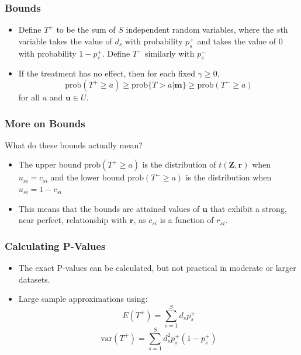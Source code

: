 \documentclass{beamer}
\begin{document}
  \begin{frame}
    \frametitle{Bounds}
    \begin{itemize}
    \item Define $T^+$ to be the sum of $S$ independent random
      variables, where the $s$th variable takes the value of $d_s$
      with probability $p^+_s$ and takes the value of 0 with
      probability $1-p^+_s$. Define $T^-$ similarly with $p^-_s$
   \item If the treatment has no effect, then for each fixed $\gamma \geq 0$,
$$\textrm{prob}(T^+\geq a) \geq \textrm{prob}\{T>a|\mathbf{m}\} \geq
\textrm{prob}(T^- \geq a)$$
for all $a$ and $\mathbf{u} \in U$.
  \end{itemize}
  \end{frame}
  \begin{frame}
    \frametitle{More on Bounds}
What do these bounds actually mean?

    \begin{itemize}
   \item<+-> The upper bound $\textrm{prob}(T^+\geq a) $ is the
      distribution of $t(\mathbf{Z},\mathbf{r})$ when $u_{si}=c_{si}$
      and the lower bound $\textrm{prob}(T^- \geq a)$ is the
      distribution when $u_{si}=1-c_{si}$
    \item<+-> This means that the bounds are attained values of
      $\mathbf{u}$ that exhibit a strong, near perfect, relationship
      with $\mathbf{r}$, as $c_{si}$ is a function of $r_{si}$. 
    \end{itemize}
  \end{frame}
  \begin{frame}
    \frametitle{Calculating P-Values}
    \begin{itemize}
    \item<+-> The \textrm{exact} P-values can be calculated, but not practical in
      moderate or larger datasets.
    \item<+-> Large sample approximations using: 
$$E(T^+)=\sum_{s=1}^Sd_sp^+_s$$
$$\textrm{var}(T^+)=\sum_{s=1}^Sd^2_sp^+_s(1-p^+_s)$$

    \end{itemize}
  \end{frame}
\end{document}
